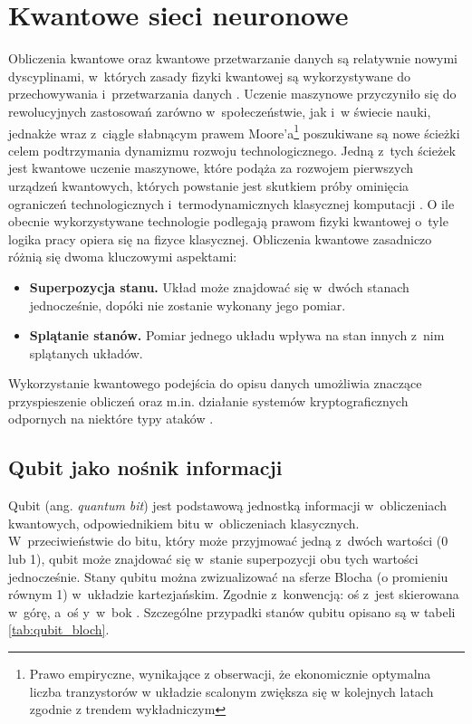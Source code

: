 \newpage
\section{Kwantowe sieci neuronowe}

Obliczenia kwantowe oraz kwantowe przetwarzanie danych są relatywnie nowymi dyscyplinami, w~których zasady fizyki kwantowej są wykorzystywane do przechowywania i~przetwarzania danych \cite{Nakahara2013}.
Uczenie maszynowe przyczyniło się do rewolucyjnych zastosowań zarówno w~społeczeństwie, jak i~w świecie nauki, jednakże wraz z~ciągle słabnącym prawem Moore’a\footnote{Prawo empiryczne, wynikające z obserwacji, że ekonomicznie optymalna liczba tranzystorów w układzie scalonym zwiększa się w kolejnych latach zgodnie z trendem wykładniczym} poszukiwane są nowe ścieżki celem podtrzymania dynamizmu rozwoju technologicznego. Jedną z~tych ścieżek jest kwantowe uczenie maszynowe, które podąża za rozwojem pierwszych urządzeń kwantowych, których powstanie jest skutkiem próby ominięcia ograniczeń technologicznych i~termodynamicznych klasycznej komputacji \cite{training_deep_quantum_nn}.
O ile obecnie wykorzystywane technologie podlegają prawom fizyki kwantowej o~tyle logika pracy opiera się na fizyce klasycznej. 
Obliczenia kwantowe zasadniczo różnią się dwoma kluczowymi aspektami:
\begin{itemize}
    \item \textbf{Superpozycja stanu.} Układ może znajdować się w~dwóch stanach jednocześnie, dopóki nie zostanie wykonany jego pomiar.
    \item \textbf{Splątanie stanów.} Pomiar jednego układu wpływa na stan innych z~nim splątanych układów.
\end{itemize}

Wykorzystanie kwantowego podejścia do opisu danych umożliwia znaczące przyspieszenie obliczeń oraz m.in. działanie systemów kryptograficznych odpornych na niektóre typy ataków \cite{Nakahara2013}.

\subsection{Qubit jako nośnik informacji}

Qubit (ang. \textit{quantum bit}) jest podstawową jednostką informacji w~obliczeniach kwantowych, odpowiednikiem bitu w~obliczeniach klasycznych. W~przeciwieństwie do bitu, który może przyjmować jedną z~dwóch wartości (0 lub 1), qubit może znajdować się w~stanie superpozycji obu tych wartości jednocześnie. Stany qubitu można zwizualizować na sferze Blocha (o promieniu równym 1) w~układzie kartezjańskim. Zgodnie z~konwencją: oś z~jest skierowana w~górę, a~oś y~w~bok \cite{quantum_intro}.
Szczególne przypadki stanów qubitu opisano są w tabeli \ref{tab:qubit_bloch}.

